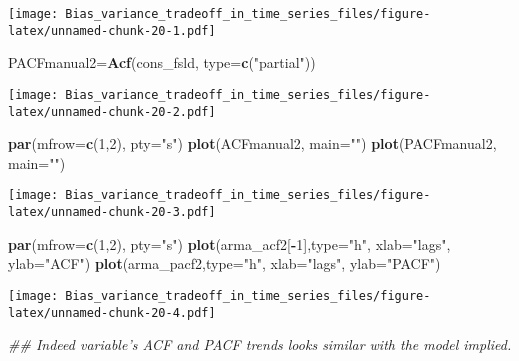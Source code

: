 \documentclass[
]{article}
\newenvironment{Shaded}{\begin{snugshade}}{\end{snugshade}}
\newcommand{\CommentTok}[1]{\textcolor[rgb]{0.56,0.35,0.01}{\textit{#1}}}
\newcommand{\DataTypeTok}[1]{\textcolor[rgb]{0.13,0.29,0.53}{#1}}
\newcommand{\DecValTok}[1]{\textcolor[rgb]{0.00,0.00,0.81}{#1}}
\newcommand{\KeywordTok}[1]{\textcolor[rgb]{0.13,0.29,0.53}{\textbf{#1}}}
\newcommand{\NormalTok}[1]{#1}
\newcommand{\OperatorTok}[1]{\textcolor[rgb]{0.81,0.36,0.00}{\textbf{#1}}}
\newcommand{\StringTok}[1]{\textcolor[rgb]{0.31,0.60,0.02}{#1}}
\begin{document}
\texttt{[image: Bias\_variance\_tradeoff\_in\_time\_series\_files/figure-latex/unnamed-chunk-20-1.pdf]}

\begin{Shaded}
\begin{Highlighting}[]
\NormalTok{PACFmanual2=}\KeywordTok{Acf}\NormalTok{(cons_fsld, }\DataTypeTok{type=}\KeywordTok{c}\NormalTok{(}\StringTok{"partial"}\NormalTok{))}
\end{Highlighting}
\end{Shaded}

\texttt{[image: Bias\_variance\_tradeoff\_in\_time\_series\_files/figure-latex/unnamed-chunk-20-2.pdf]}

\begin{Shaded}
\begin{Highlighting}[]
\KeywordTok{par}\NormalTok{(}\DataTypeTok{mfrow=}\KeywordTok{c}\NormalTok{(}\DecValTok{1}\NormalTok{,}\DecValTok{2}\NormalTok{), }\DataTypeTok{pty=}\StringTok{"s"}\NormalTok{)}
\KeywordTok{plot}\NormalTok{(ACFmanual2, }\DataTypeTok{main=}\StringTok{""}\NormalTok{)}
\KeywordTok{plot}\NormalTok{(PACFmanual2, }\DataTypeTok{main=}\StringTok{""}\NormalTok{)}
\end{Highlighting}
\end{Shaded}

\texttt{[image: Bias\_variance\_tradeoff\_in\_time\_series\_files/figure-latex/unnamed-chunk-20-3.pdf]}

\begin{Shaded}
\begin{Highlighting}[]
\KeywordTok{par}\NormalTok{(}\DataTypeTok{mfrow=}\KeywordTok{c}\NormalTok{(}\DecValTok{1}\NormalTok{,}\DecValTok{2}\NormalTok{), }\DataTypeTok{pty=}\StringTok{"s"}\NormalTok{)}
\KeywordTok{plot}\NormalTok{(arma_acf2[}\OperatorTok{-}\DecValTok{1}\NormalTok{],}\DataTypeTok{type=}\StringTok{"h"}\NormalTok{, }\DataTypeTok{xlab=}\StringTok{"lags"}\NormalTok{, }\DataTypeTok{ylab=}\StringTok{"ACF"}\NormalTok{)}
\KeywordTok{plot}\NormalTok{(arma_pacf2,}\DataTypeTok{type=}\StringTok{"h"}\NormalTok{, }\DataTypeTok{xlab=}\StringTok{"lags"}\NormalTok{, }\DataTypeTok{ylab=}\StringTok{"PACF"}\NormalTok{)}
\end{Highlighting}
\end{Shaded}

\texttt{[image: Bias\_variance\_tradeoff\_in\_time\_series\_files/figure-latex/unnamed-chunk-20-4.pdf]}

\begin{Shaded}
\begin{Highlighting}[]
\CommentTok{## Indeed variable's ACF and PACF trends looks similar with the model implied.}
\end{Highlighting}
\end{Shaded}
\end{document}
